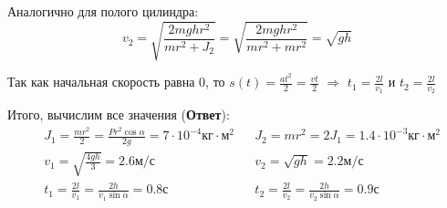 \documentclass[a4paper,12pt]{article}
\begin{document}
    Аналогично для полого цилиндра:
    \begin{equation}
        v_2 = \sqrt{
            \frac{2mghr^2}{mr^2 + J_2}
        } = \sqrt{
            \frac{2mghr^2}{mr^2 + mr^2}
        } = \sqrt{
            gh
        }
    \end{equation}

    Так как начальная скорость равна 0, то $s(t) = \frac{at^2}{2} = \frac{vt}{2}$ $\Rightarrow$
    $t_1 = \frac{2l}{v_1}$ и $t_2 = \frac{2l}{v_2}$

    Итого, вычислим все значения (\textbf{Ответ}):
    \begin{equation}
        \begin{aligned}
            &J_1 = \frac{mr^2}{2} = \frac{Pr^2\cos\alpha}{2g} =  7\cdot 10^{-4} \text{кг}\cdot\text{м}^2 & 
            &J_2 = mr^2 = 2J_1 = 1.4 \cdot 10^{-3} \text{кг}\cdot\text{м}^2 \\
            &v_1 = \sqrt{
                \frac{4gh}{3}
            } = 2.6 \text{м/с}  &
            &v_2 = \sqrt{gh} = 2.2 \text{м/с} \\
            &t_1 = \frac{2l}{v_1} = \frac{2h}{v_1\sin\alpha} = 0.8 \text{с} &
            &t_2 = \frac{2l}{v_2} = \frac{2h}{v_2\sin\alpha} = 0.9 \text{с}
        \end{aligned}
    \end{equation}
\end{document}
